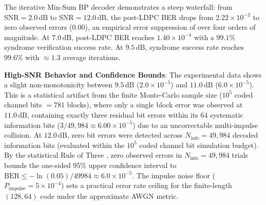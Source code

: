 \documentclass[conference]{IEEEtran}
\begin{document}
The iterative Min-Sum BP decoder demonstrates a steep waterfall: from $\text{SNR}=2.0\,\text{dB}$ to $\text{SNR}=12.0\,\text{dB}$, the post-LDPC BER drops from $2.22 \times 10^{-2}$ to zero observed errors ($0.00$), an empirical error suppression of over four orders of magnitude. At $7.0\,\text{dB}$, post-LDPC BER reaches $1.40 \times 10^{-4}$ with a $99.1\%$ syndrome verification success rate. At $9.5\,\text{dB}$, syndrome success rate reaches $99.6\%$ with $\approx\!1.3$ average iterations.

\textbf{High-SNR Behavior and Confidence Bounds}: The experimental data shows a slight non-monotonicity between $9.5\,\text{dB}$ ($2.0 \times 10^{-5}$) and $11.0\,\text{dB}$ ($6.0 \times 10^{-5}$). This is a statistical artifact from the finite Monte-Carlo sample size ($10^5$ coded channel bits $= 781$ blocks), where only a single block error was observed at $11.0\,\text{dB}$, containing exactly three residual bit errors within its $64$ systematic information bits ($3 / 49{,}984 \approx 6.00 \times 10^{-5}$) due to an uncorrectable multi-impulse collision. At $12.0\,\text{dB}$, zero bit errors were detected across $N_{\text{info}} = 49{,}984$ decoded information bits (evaluated within the $10^5$ coded channel bit simulation budget). By the statistical Rule of Three \cite{richardson2008}, zero observed errors in $N_{\text{info}} = 49{,}984$ trials bounds the one-sided $95\%$ upper confidence interval to $\text{BER} \le -\ln(0.05)/49984 \approx 6.0 \times 10^{-5}$. The impulse noise floor ($P_{\text{impulse}} = 5 \times 10^{-4}$) sets a practical error rate ceiling for the finite-length $(128, 64)$ code under the approximate AWGN metric.
\end{document}
